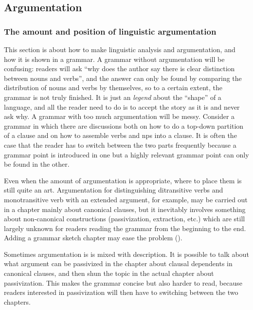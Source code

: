 \documentclass{article}
\begin{document}
\subsection{Argumentation}\label{sec:argumentation}

\subsubsection{The amount and position of linguistic argumentation}

This section is about how to make linguistic analysis and argumentation,
and how it is shown in a grammar.
A grammar without argumentation will be confusing:
readers will ask ``why does the author say there is clear distinction between nouns and verbs'',
and the answer can only be found by comparing the distribution of nouns and verbs by themselves,
so to a certain extent, the grammar is not truly finished.
It is just an \emph{legend} about the ``shape'' of a language,
and all the reader need to do is to accept the story as it is and never ask why.
A grammar with too much argumentation will be messy.
Consider a grammar in which there are discussions both 
on how to do a top-down partition of a clause 
and on how to assemble verbs and \ac{np}s into a clause. %
It is often the case that the reader has to switch between the two parts frequently 
because a grammar point is introduced in one 
but a highly relevant grammar point can only be found in the other.

Even when the amount of argumentation is appropriate,
where to place them is still quite an art.
Argumentation for distinguishing ditransitive verbs and monotransitive verb with an extended argument,
for example, may be carried out in a chapter mainly about canonical clauses,
but it inevitably involves something about non-canonical constructions 
(passivization, extraction, etc.)
which are still largely unknown for readers reading the grammar from the beginning to the end.
Adding a grammar sketch chapter may ease the problem ().

Sometimes argumentation is is mixed with description.
It is possible to talk about what argument can be passivized 
in the chapter about clausal dependents in canonical clauses,
and then shun the topic in the actual chapter about passivization.
This makes the grammar concise but also harder to read,
because readers interested in passivization 
will then have to switching between the two chapters.
\end{document}
